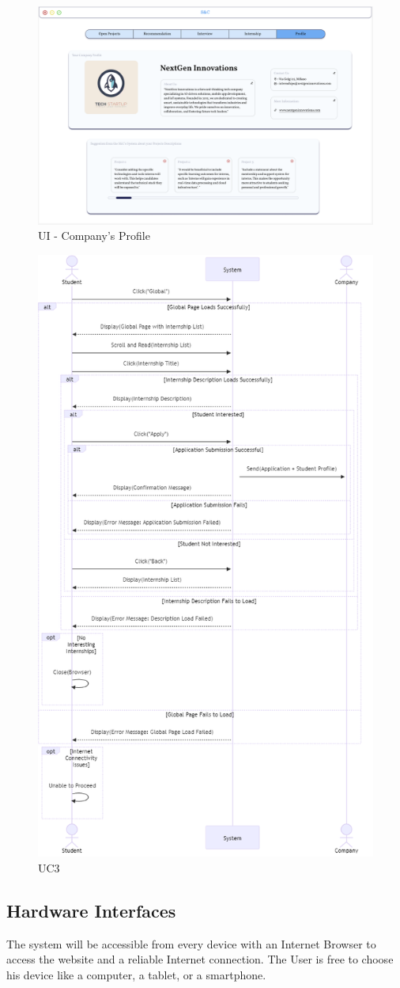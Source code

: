 \begin{figure}[H]
    \centering
    \includegraphics[width=0.8\linewidth]{RASD//Images/UI - Company's Profile.png}
    \caption{UI - Company's Profile}
\end{figure}

\begin{figure}[H]
    \centering
    \includegraphics[width=0.5\linewidth]{RASD//Images/UC3.png}
    \caption{UC3}
\end{figure}

\subsection{Hardware Interfaces}
The system will be accessible from every device with an Internet Browser to access the website and a reliable Internet connection. The User is free to choose his device like a computer, a tablet, or a smartphone.

